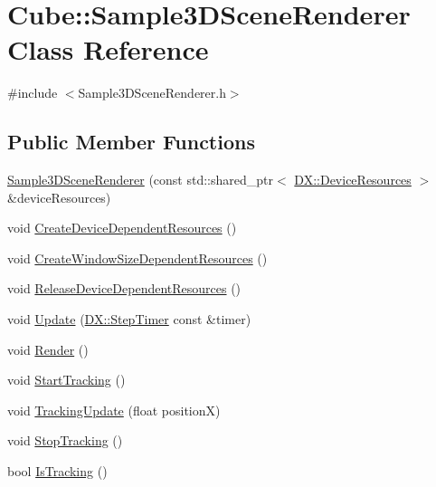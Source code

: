 \hypertarget{class_cube_1_1_sample3_d_scene_renderer}{}\section{Cube\+:\+:Sample3\+D\+Scene\+Renderer Class Reference}
\label{class_cube_1_1_sample3_d_scene_renderer}


{\ttfamily \#include $<$Sample3\+D\+Scene\+Renderer.\+h$>$}

\subsection*{Public Member Functions}
\begin{DoxyCompactItemize}
\item 
\hyperlink{class_cube_1_1_sample3_d_scene_renderer_a7909da3aa7c4ba6361661f2ece368a2d}{Sample3\+D\+Scene\+Renderer} (const std\+::shared\+\_\+ptr$<$ \hyperlink{class_d_x_1_1_device_resources}{D\+X\+::\+Device\+Resources} $>$ \&device\+Resources)
\item 
void \hyperlink{class_cube_1_1_sample3_d_scene_renderer_ac5c1b9d012427c30e3effcf67ff8f25e}{Create\+Device\+Dependent\+Resources} ()
\item 
void \hyperlink{class_cube_1_1_sample3_d_scene_renderer_a8acbf7e8d801ddf062851b9e794e54e0}{Create\+Window\+Size\+Dependent\+Resources} ()
\item 
void \hyperlink{class_cube_1_1_sample3_d_scene_renderer_a5d1f13079eaa3e1886c93dd7c6f24ac1}{Release\+Device\+Dependent\+Resources} ()
\item 
void \hyperlink{class_cube_1_1_sample3_d_scene_renderer_af555ad87256af7d64b7e042168b265c9}{Update} (\hyperlink{class_d_x_1_1_step_timer}{D\+X\+::\+Step\+Timer} const \&timer)
\item 
void \hyperlink{class_cube_1_1_sample3_d_scene_renderer_a37bf25ee0aed8bff432561342c64f69f}{Render} ()
\item 
void \hyperlink{class_cube_1_1_sample3_d_scene_renderer_afc24dc351309fe6db63260b47d0663d9}{Start\+Tracking} ()
\item 
void \hyperlink{class_cube_1_1_sample3_d_scene_renderer_af4f66156b00ceca7bcc4483c3cbfb7c5}{Tracking\+Update} (float positionX)
\item 
void \hyperlink{class_cube_1_1_sample3_d_scene_renderer_ae6de1b3c885db98e5898c2c61cea8bbd}{Stop\+Tracking} ()
\item 
bool \hyperlink{class_cube_1_1_sample3_d_scene_renderer_a20c1e994204618d7fbf3efc1b2bbf775}{Is\+Tracking} ()
\end{DoxyCompactItemize}


